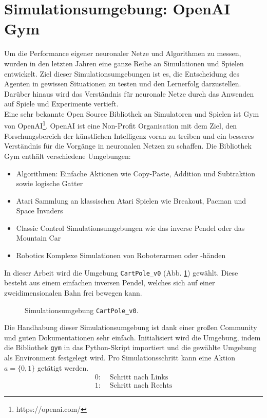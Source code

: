\section{Simulationsumgebung: OpenAI Gym}
\label{sec:imp_sim}
	Um die Performance eigener neuronaler Netze und Algorithmen zu messen, wurden in den letzten Jahren eine ganze Reihe an Simulationen und Spielen entwickelt. Ziel dieser Simulationsumgebungen ist es, die Entscheidung des Agenten in gewissen Situationen zu testen und den Lernerfolg darzustellen. Darüber hinaus wird das Verständnis für neuronale Netze durch das Anwenden auf Spiele und Experimente vertieft.\\
	Eine sehr bekannte Open Source Bibliothek an Simulatoren und Spielen ist Gym von OpenAI\footnote{https://openai.com/}. OpenAI ist eine Non-Profit Organisation mit dem Ziel, den Forschungsbereich der künstlichen Intelligenz voran zu treiben und ein besseres Verständnis für die Vorgänge in neuronalen Netzen zu schaffen. Die Bibliothek Gym enthält verschiedene Umgebungen:
	\begin{itemize}
		\item Algorithmen:
		\subitem Einfache Aktionen wie Copy-Paste, Addition und Subtraktion sowie logische Gatter
		\item Atari
		\subitem Sammlung an klassischen Atari Spielen wie Breakout, Pacman und Space Invaders
		\item Classic Control
		\subitem Simulationsumgebungen wie das inverse Pendel oder das Mountain Car
		\item Robotics
		\subitem Komplexe Simulationen von Roboterarmen oder -händen
	\end{itemize}
	In dieser Arbeit wird die Umgebung \texttt{CartPole\_v0} (Abb. \ref{fig:imp_cartpole}) gewählt. Diese besteht aus einem einfachen inversen Pendel, welches sich auf einer zweidimensionalen Bahn frei bewegen kann.
	\begin{figure}[H] %
		\centering
		\def\svgwidth{12cm}
		
		\caption{Simulationsumgebung \texttt{CartPole\_v0}.}
		\label{fig:imp_cartpole}
	\end{figure}
	Die Handhabung dieser Simulationsumgebung ist dank einer großen Community und guten Dokumentationen sehr einfach. Initialisiert wird die Umgebung, indem die Bibliothek \texttt{gym} in das Python-Skript importiert und die gewählte Umgebung als \glqq Environment \grqq{}festgelegt wird. Pro Simulationsschritt kann eine Aktion $a = \{0,1\}$ getätigt werden.
	\begin{align*}
		0 :& \text{ Schritt nach Links}\\
		1 :& \text{ Schritt nach Rechts}
	\end{align*}
